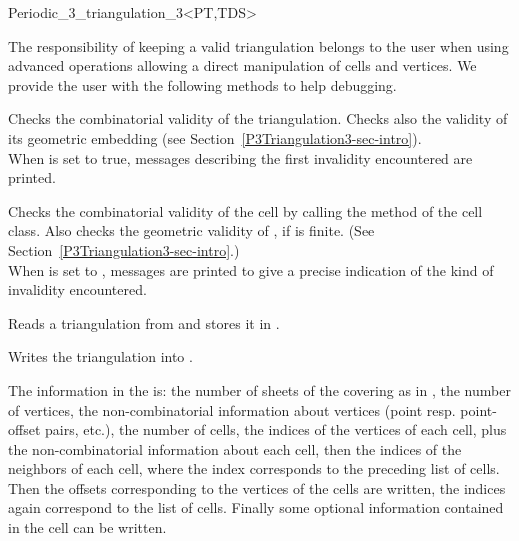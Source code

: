 \begin{ccRefClass}{Periodic_3_triangulation_3<PT,TDS>}
\begin{ccAdvanced}

The responsibility of keeping a valid triangulation belongs to the user
when using advanced operations allowing a direct manipulation of cells
and vertices. We provide the user with the following methods to help
debugging. 

{Checks the combinatorial validity of the triangulation. Checks also the
validity of its geometric embedding (see
Section~\ref{P3Triangulation3-sec-intro}).\\ When 
is set to true, messages describing the first invalidity encountered
are printed.} 

{Checks the combinatorial validity of the cell by calling the
 method of the  cell
class. Also checks the geometric validity of , if  is
finite. (See Section~\ref{P3Triangulation3-sec-intro}.)\\ 
When  is set to , messages are printed to give
a precise indication of the kind of invalidity encountered.}

\end{ccAdvanced}


{Reads a triangulation from  and stores it in .
}

{Writes the triangulation  into .}

The information in the  is: the number of sheets of the
covering as in ,
the number of vertices, the non-combinatorial information about
vertices (point resp. point-offset pairs, etc.), the number of cells,
the indices of the vertices of each cell, plus the non-combinatorial
information about each cell, then the indices of the neighbors of each
cell, where the index corresponds to the preceding list of cells. Then
the offsets corresponding to the vertices of the cells are written,
the indices again correspond to the list of cells. Finally some
optional information contained in the cell can be written.

\ccSeeAlso



\end{ccRefClass}
